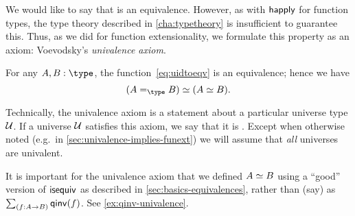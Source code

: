 We would like to say that \idtoeqv is an equivalence.
However, as with $\mathsf{happly}$ for function types, the type theory described in \autoref{cha:typetheory} is insufficient to guarantee this.
Thus, as we did for function extensionality, we formulate this property as an axiom: Voevodsky's \emph{univalence axiom}.

\begin{axiom}[Univalence]\label{axiom:univalence}
  For any $A,B:\type$, the function~\eqref{eq:uidtoeqv} is an equivalence; hence we have
  \[
\eqv{(\id[\type]{A}{B})}{(\eqv A B)}.
\]
\end{axiom}

Technically, the univalence axiom is a statement about a particular universe type $\mathcal{U}$.
If a universe $\mathcal{U}$ satisfies this axiom, we say that it is .
%
%
Except when otherwise noted (e.g.\ in \autoref{sec:univalence-implies-funext}) we will assume that \emph{all} universes are univalent.

\begin{rmk}
  It is important for the univalence axiom that we defined $A \simeq B$ using a ``good'' version of $\mathsf{isequiv}$ as described in \autoref{sec:basics-equivalences}, rather than (say) as $\sm{f:A\to B} \qinv(f)$.
  See \autoref{ex:qinv-univalence}.
\end{rmk}

